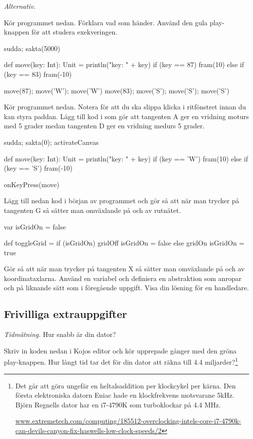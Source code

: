 \Task \emph{Alternativ.}

\Subtask Kör programmet nedan. Förklara vad som händer. Använd den gula play-knappen för att studera exekveringen.

\begin{Code}
sudda; sakta(5000)

def move(key: Int): Unit = {
  println("key: " + key)
  if (key == 87) fram(10) 
  else if (key == 83) fram(-10)  
}

move(87); move('W'); move('W')
move(83); move('S'); move('S'); move('S')
\end{Code}

\Subtask Kör programmet nedan. Notera  för att du ska slippa klicka i ritfönstret innan du kan styra paddan. Lägg till kod i  som gör att tangenten A ger en vridning moturs med 5 grader medan tangenten D ger en vridning medurs 5 grader.

\begin{Code}
sudda; sakta(0); activateCanvas

def move(key: Int): Unit = {
  println("key: " + key)
  if (key == 'W') fram(10) 
  else if (key == 'S') fram(-10)  
}

onKeyPress(move)
\end{Code}

\Subtask Lägg till nedan kod i början av programmet och gör så att när man trycker på tangenten G så  sätter man omväxlande på och av rutnätet. 

\begin{Code}
var isGridOn = false

def toggleGrid = 
  if (isGridOn) {
    gridOff
    isGridOn = false
  } else {
    gridOn
    isGridOn = true  
  }
\end{Code}

\Subtask\Checkpoint Gör så att när man trycker på tangenten X så sätter man omväxlande på och av koordinataxlarna. Använd en variabel  och definiera en abstraktion  som anropar  och  på liknande sätt som i föregående uppgift. Visa din lösning för en handledare.

\subsection{Frivilliga extrauppgifter}

\Task \emph{Tidmätning.} Hur snabb är din dator?

\Subtask \label{task:timer} Skriv in koden nedan i Kojos editor och kör upprepade gånger med den gröna play-knappen. Hur långt tid tar det för din dator att räkna till 4.4 miljarder?\footnote{Det går att göra ungefär en heltalsaddition per klockcykel per kärna. Den första elektroniska datorn Eniac hade en klockfrekvens motsvarane 5kHz. Björn Regnells dator har en i7-4790K som turboklockar på 4.4 MHz. 

\href{http://www.extremetech.com/computing/185512-overclocking-intels-core-i7-4790k-can-devils-canyon-fix-haswells-low-clock-speeds/2}{www.extremetech.com/computing/185512-overclocking-intels-core-i7-4790k-can-devils-canyon-fix-haswells-low-clock-speeds/2}
}

